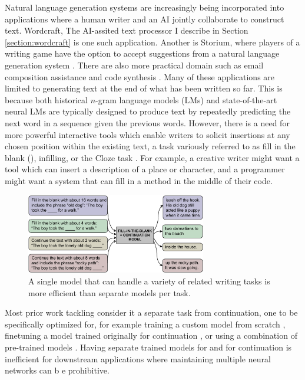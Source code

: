 Natural language generation systems are increasingly being incorporated into applications where a human writer and an AI jointly collaborate to construct text.
Wordcraft, The AI-assited text processor I describe in Section \ref{section:wordcraft} is one such application.
Another is Storium, where players of a writing game have the option to accept suggestions from a natural language generation system \citep{akoury2020storium}.
There are also more practical domain such as email composition assistance and code synthesis \citep{buschek2021impact,wu2018smart,austin2021program}.
Many of these applications are limited to generating text at the end of what has been written so far.
This is because
both historical $n$-gram language models (LMs) and state-of-the-art neural LMs
are typically designed to produce text by repeatedly predicting the next word in a sequence given the previous words.
However, there is a need for more powerful interactive tools which enable writers to solicit insertions at any chosen position within the existing text, a task variously referred to as fill in the blank (\FitB), infilling, or the Cloze task \citep{taylor1953cloze}.
For example, a creative writer might want a tool which can insert a description of a place or character, and a programmer might want a system that can fill in a method in the middle of their code.

\begin{figure}[tbp]
    \centering
    \includegraphics[width=0.7\textwidth]{figures/leading_figure.pdf}
    \caption{A single model that can handle a variety of related writing tasks is more efficient than separate models per task.}
    \label{fig:leading_figure}
\end{figure}

Most prior work tackling \FitB{} consider it a separate task from continuation, one to be specifically optimized for, for example training a custom model from scratch \citep{ippolito2019unsupervised,zhu2019text,mori2020finding}, finetuning a model trained originally for continuation \citep{donahue2020enabling}, or using a combination of pre-trained models \citep{huang2020inset}.
Having separate trained models for \FitB{} and for continuation is inefficient for downstream applications where maintaining multiple neural networks can b e prohibitive.

